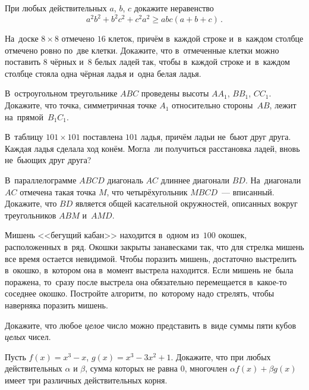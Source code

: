\resetproblem \begingroup %
    \def\jeolmdate{17 октября 2018 г.}%
    \def\jeolmauthors{Орлов О.\,П., Тихонов Ю.\,В.}%
\jeolmheader \endgroup


\begin{problems}

\item 
При любых действительных $a$, $b$, $c$ докажите неравенство
\[
    a^2 b^2 + b^2 c^2 + c^2 a^2 \geq abc(a + b + c)
\, . \]

\item 
На~доске $8 \times 8$ отмечено $16$ клеток, причём в~каждой строке и~в~каждом столбце отмечено ровно по~две клетки.
Докажите, что в~отмеченные клетки можно поставить $8$ чёрных и~$8$ белых ладей так, чтобы в~каждой строке и~в~каждом столбце стояла одна чёрная ладья и~одна белая ладья.

\item 
В~остроугольном треугольнике $ABC$ проведены высоты $AA_1$, $BB_1$, $CC_1$.
Докажите, что точка, симметричная точке $A_1$ относительно стороны~$AB$, лежит на~прямой~$B_1C_1$.

\item 
В~таблицу $101 \times 101$ поставлена $101$ ладья, причём ладьи не~бьют друг друга.
Каждая ладья сделала ход конём.
Могла~ли получиться расстановка ладей, вновь не~бьющих друг друга?

\item 
В~параллелограмме $ABCD$ диагональ $AC$ длиннее диагонали $BD$.
На~диагонали $AC$ отмечена такая точка $M$, что четырёхугольник $MBCD$~--- вписанный.
Докажите, что $BD$ является общей касательной окружностей, описанных вокруг треугольников $ABM$ и~$AMD$.

\item 
Мишень <<бегущий кабан>> находится в~одном из~$100$ окошек, расположенных в~ряд.
Окошки закрыты занавесками так, что для стрелка мишень все время остается невидимой.
Чтобы поразить мишень, достаточно выстрелить в~окошко, в~котором она в~момент выстрела находится.
Если мишень не~была поражена, то~сразу после выстрела она обязательно перемещается в~какое-то соседнее окошко.
Постройте алгоритм, по~которому надо стрелять, чтобы наверняка поразить мишень.

\item 
Докажите, что любое \emph{целое} число можно представить в~виде суммы пяти кубов \emph{целых} чисел.

\itemx{$^+$}
Пусть $f(x) = x^3 - x$, $g(x) = x^3 - 3 x^2 + 1$.
Докажите, что при любых действительных $\alpha$ и $\beta$, сумма которых не равна 0, многочлен $\alpha f(x) + \beta g(x)$ имеет три различных действительных корня.

\end{problems}


